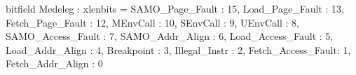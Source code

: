 bitfield Medeleg : xlenbits = {
  SAMO_Page_Fault   : 15,
  Load_Page_Fault   : 13,
  Fetch_Page_Fault  : 12,
  MEnvCall          : 10,
  SEnvCall          : 9,
  UEnvCall          : 8,
  SAMO_Access_Fault : 7,
  SAMO_Addr_Align   : 6,
  Load_Access_Fault : 5,
  Load_Addr_Align   : 4,
  Breakpoint        : 3,
  Illegal_Instr     : 2,
  Fetch_Access_Fault: 1,
  Fetch_Addr_Align  : 0
}

